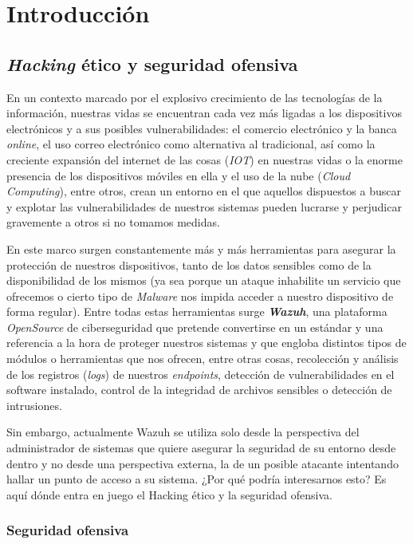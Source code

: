 \chapter{Introducción}

\section{\textit{Hacking} ético y seguridad ofensiva}

En un contexto marcado por el explosivo crecimiento de las tecnologías de la información, nuestras vidas se encuentran cada vez más ligadas a los dispositivos electrónicos y a sus posibles vulnerabilidades: el comercio electrónico y la banca \textit{online}, el uso correo electrónico como alternativa al tradicional, así como la creciente expansión del internet de las cosas (\textit{IOT}) en nuestras vidas o la enorme presencia de los dispositivos móviles en ella y el uso de la nube (\textit{Cloud Computing}), entre otros, crean un entorno en el que aquellos dispuestos a buscar y explotar las vulnerabilidades de nuestros sistemas pueden lucrarse y perjudicar gravemente a otros si no tomamos medidas.

    En este marco surgen constantemente más y más herramientas para asegurar la protección de nuestros dispositivos, tanto de los datos sensibles como de la disponibilidad de los mismos (ya sea porque un ataque inhabilite un servicio que ofrecemos o cierto tipo de \textit{Malware} nos impida acceder a nuestro dispositivo de forma regular). Entre todas estas herramientas surge \textbf{\textit{Wazuh}}, una plataforma \textit{OpenSource} de ciberseguridad que pretende convertirse en un estándar y una referencia a la hora de proteger nuestros sistemas y que engloba distintos tipos de módulos o herramientas que nos ofrecen, entre otras cosas, recolección y análisis de los registros (\textit{logs}) de nuestros \textit{endpoints}, detección de vulnerabilidades en el software instalado, control de la integridad de archivos sensibles o detección de intrusiones. 

Sin embargo, actualmente Wazuh se utiliza solo desde la perspectiva del administrador de sistemas que quiere asegurar la seguridad de su entorno desde dentro y no desde una perspectiva externa, la de un posible atacante intentando hallar un punto de acceso a su sistema. ¿Por qué podría interesarnos esto? Es aquí dónde entra en juego el Hacking ético y la seguridad ofensiva.

\subsection{Seguridad ofensiva}

